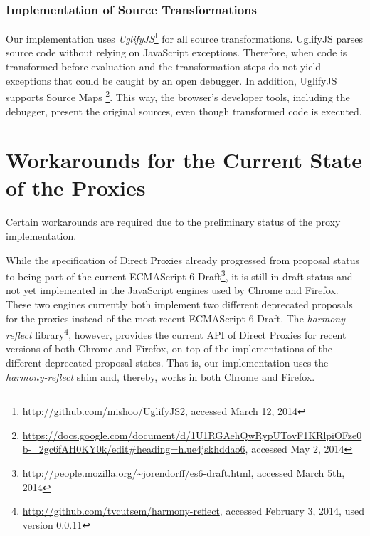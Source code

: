 












\subsubsection{Implementation of Source Transformations}

Our implementation uses \emph{UglifyJS}\footnote{\url{http://github.com/mishoo/UglifyJS2}, accessed March 12, 2014} for all source transformations.
UglifyJS parses source code without relying on JavaScript exceptions.
Therefore, when code is transformed before evaluation and the transformation steps do not yield exceptions that could be caught by an open debugger.
In addition, UglifyJS supports Source Maps \footnote{\url{https://docs.google.com/document/d/1U1RGAehQwRypUTovF1KRlpiOFze0b-_2gc6fAH0KY0k/edit\#heading=h.ue4jskhddao6}, accessed May 2, 2014}.
This way, the browser's developer tools, including the debugger, present the original sources, even though transformed code is executed.





\section{Workarounds for the Current State of the Proxies} \label{sec:IMPLEMENTATION:4}


Certain workarounds are required due to the preliminary status of the proxy implementation.

While the specification of Direct Proxies already progressed from proposal status to being part of the current ECMAScript 6 Draft\footnote{\url{http://people.mozilla.org/~jorendorff/es6-draft.html}, accessed March 5th, 2014}, it is still in draft status and not yet implemented in the JavaScript engines used by Chrome and Firefox.
These two engines currently both implement two different deprecated proposals for the proxies instead of the most recent ECMAScript 6 Draft.
The \emph{harmony-reflect} library\footnote{\url{http://github.com/tvcutsem/harmony-reflect}, accessed February 3, 2014, used version 0.0.11}, however, provides the current API of Direct Proxies for recent versions of both Chrome and Firefox, on top of the implementations of the different deprecated proposal states.
That is, our implementation uses the \emph{harmony-reflect} shim and, thereby, works in both Chrome and Firefox.

